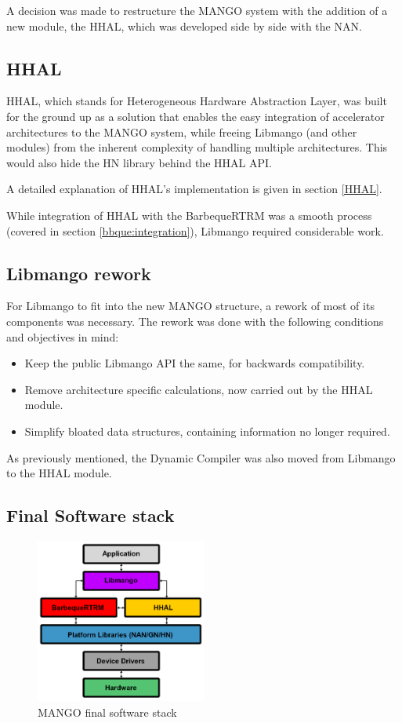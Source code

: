 A decision was made to restructure the MANGO system with the addition of a new module, the HHAL, which was developed side by side with the NAN.

\subsection{HHAL}

HHAL, which stands for Heterogeneous Hardware Abstraction Layer, was built for the ground up as a solution that enables the easy integration of accelerator architectures to the MANGO system, while freeing Libmango (and other modules) from the inherent complexity of handling multiple architectures. This would also hide the HN library behind the HHAL API.

A detailed explanation of HHAL's implementation is given in section \ref{HHAL}.

While integration of HHAL with the BarbequeRTRM was a smooth process (covered in section \ref{bbque:integration}), Libmango required considerable work.

\subsection{Libmango rework}

For Libmango to fit into the new MANGO structure, a rework of most of its components was necessary. The rework was done with the following conditions and objectives in mind:
\begin{itemize}
    \item Keep the public Libmango API the same, for backwards compatibility.
    \item Remove architecture specific calculations, now carried out by the HHAL module.
    \item Simplify bloated data structures, containing information no longer required.
\end{itemize}

As previously mentioned, the Dynamic Compiler was also moved from Libmango to the HHAL module.

\subsection{Final Software stack}

\begin{figure}[ht]
    \centering
    \includegraphics[width=0.5\textwidth]{img/mango-final-stack.png}
    \captionsetup{justification=centering}
    \caption{MANGO final software stack}
    \label{fig:mango_final_stack}
\end{figure}

